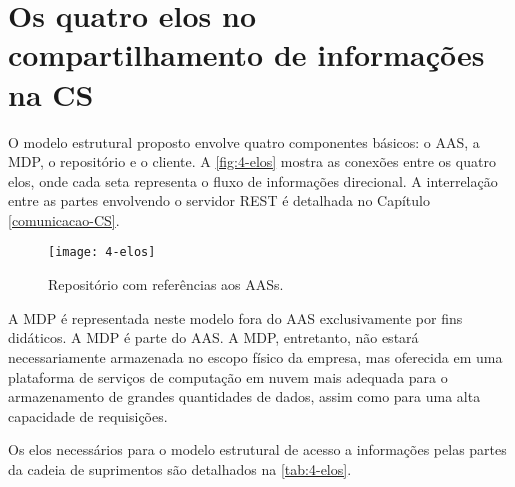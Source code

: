 \section{Os quatro elos no compartilhamento de informações na CS}
	
	O modelo estrutural proposto envolve quatro componentes básicos: o AAS, a MDP, o repositório e o cliente. A \autoref{fig:4-elos} mostra as conexões entre os quatro elos, onde cada seta representa o fluxo de informações direcional. A interrelação entre as partes envolvendo o servidor REST é detalhada no Capítulo \ref{comunicacao-CS}.
	
	\begin{figure}[htb]
		\centering
		\caption{Repositório com referências aos AASs.}
		\label{fig:4-elos}
		\texttt{[image: 4-elos]}
	\end{figure}
	
	A MDP é representada neste modelo fora do AAS exclusivamente por fins didáticos. A MDP é parte do AAS. A MDP, entretanto, não estará necessariamente armazenada no escopo físico da empresa, mas oferecida em uma plataforma de serviços de computação em nuvem mais adequada para o armazenamento de grandes quantidades de dados, assim como para uma alta capacidade de requisições.
	
	Os elos necessários para o modelo estrutural de acesso a informações pelas partes da cadeia de suprimentos são detalhados na \autoref{tab:4-elos}.
	
